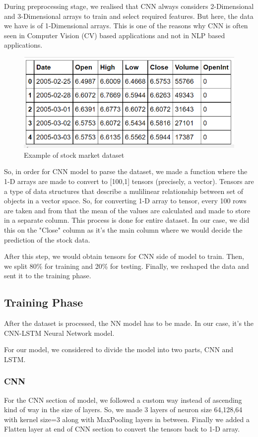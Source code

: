 \documentclass[conference]{IEEEtran}
\begin{document}
During preprocessing stage, we realised that CNN always considers 2-Dimensional and 3-Dimensional arrays to train and select required features. But here, the data we have is of 1-Dimensional arrays. This is one of the reasons why CNN is often seen in Computer Vision (CV) based applications and not in NLP based applications. 

\begin{figure}[htbp]
\centerline{\includegraphics[scale=0.7]{Annotation-1.png}}
\caption{Example of stock market dataset}
\label{dataset-1}
\end{figure}

So, in order for CNN model to parse the dataset, we made a function where the 1-D arrays are made to convert to [100,1] tensors (precisely, a vector). Tensors are a type of data structures that describe a mulilinear relationship between set of objects in a vector space. So, for converting 1-D array to tensor, every 100 rows are taken and from that the mean of the values are calculated and made to store in a separate column. This process is done for entire dataset. In our case, we did this on the "Close" column as it's the main column where we would decide the prediction of the stock data.

After this step, we would obtain tensors for CNN side of model to train. Then, we split 80\% for training and 20\% for testing. Finally, we reshaped the data and sent it to the training phase. 

\subsection{Training Phase}\label{B}
After the dataset is processed, the NN model has to be made. In our case, it's the CNN-LSTM Neural Network model. 

For our model, we considered to divide the model into two parts, CNN and LSTM.

\subsubsection{CNN}
For the CNN section of model, we followed a custom way instead of ascending kind of way in the size of layers. So, we made 3 layers of neuron size 64,128,64 with kernel size=3 along with MaxPooling layers in between. Finally we added a Flatten layer at end of CNN section to convert the tensors back to 1-D array.
\end{document}
